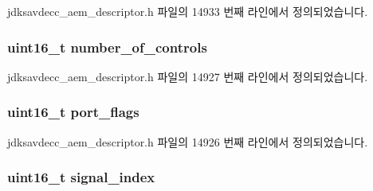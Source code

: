 jdksavdecc\+\_\+aem\+\_\+descriptor.\+h 파일의 14933 번째 라인에서 정의되었습니다.

\subsubsection[{\texorpdfstring{number\+\_\+of\+\_\+controls}{number_of_controls}}]{\setlength{\rightskip}{0pt plus 5cm}uint16\+\_\+t number\+\_\+of\+\_\+controls}\hypertarget{structjdksavdecc__descriptor__external__port_a0104bea638bdadf1a547c2b93813e22f}{}\label{structjdksavdecc__descriptor__external__port_a0104bea638bdadf1a547c2b93813e22f}


jdksavdecc\+\_\+aem\+\_\+descriptor.\+h 파일의 14927 번째 라인에서 정의되었습니다.

\subsubsection[{\texorpdfstring{port\+\_\+flags}{port_flags}}]{\setlength{\rightskip}{0pt plus 5cm}uint16\+\_\+t port\+\_\+flags}\hypertarget{structjdksavdecc__descriptor__external__port_a60a1f1704542df3b3f6e6db56622ddd9}{}\label{structjdksavdecc__descriptor__external__port_a60a1f1704542df3b3f6e6db56622ddd9}


jdksavdecc\+\_\+aem\+\_\+descriptor.\+h 파일의 14926 번째 라인에서 정의되었습니다.

\subsubsection[{\texorpdfstring{signal\+\_\+index}{signal_index}}]{\setlength{\rightskip}{0pt plus 5cm}uint16\+\_\+t signal\+\_\+index}\hypertarget{structjdksavdecc__descriptor__external__port_ae2e81a95ee9ad83f1fe22b6a1ee29075}{}\label{structjdksavdecc__descriptor__external__port_ae2e81a95ee9ad83f1fe22b6a1ee29075}


